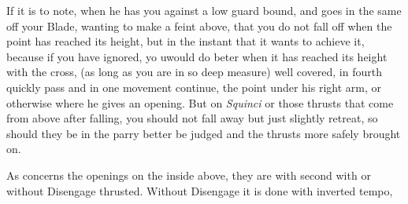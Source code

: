 If it is to note, when he has you against a low guard bound, and goes
in the same off your Blade, wanting to make a feint above, that you do
not fall off when the point has reached its height, but in the instant
that it wants to achieve it, because if you have ignored, yo uwould do
beter when it has reached its height with the cross, (as long as you
are in so deep measure) well covered, in fourth quickly
pass and in one movement continue, the point under his right arm, or
otherwise where he gives an opening. But on {\it Squinci} or those
thrusts that come from above after falling, you should not fall away
but just slightly retreat, so should they be in the parry better be
judged and the thrusts more safely brought on.


As concerns the openings on the inside above, they are with second
with or without Disengage thrusted. Without Disengage it is done with
inverted tempo,
